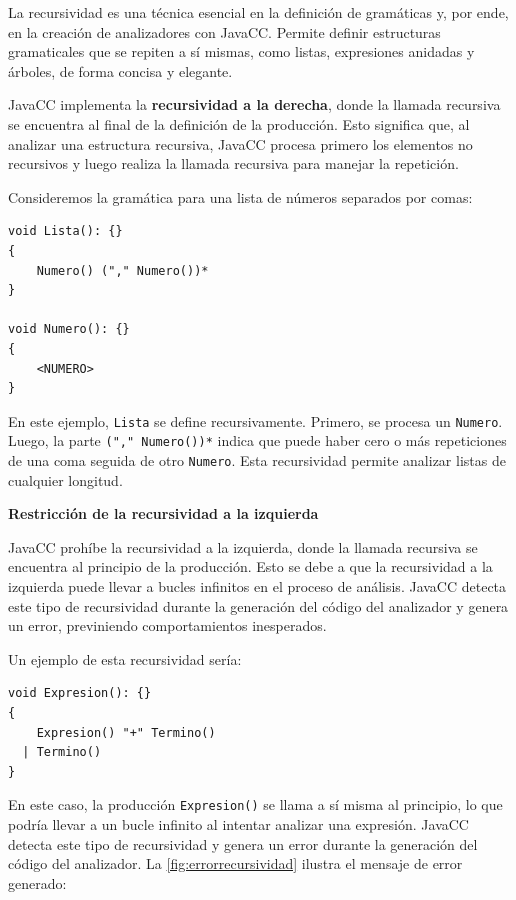 \noindent La recursividad es una técnica esencial en la definición de gramáticas y, por ende, en la creación de analizadores con JavaCC. Permite definir estructuras gramaticales que se repiten a sí mismas, como listas, expresiones anidadas y árboles, de forma concisa y elegante.

JavaCC implementa la \textbf{recursividad a la derecha}, donde la llamada recursiva se encuentra al final de la definición de la producción. Esto significa que, al analizar una estructura recursiva, JavaCC procesa primero los elementos no recursivos y luego realiza la llamada recursiva para manejar la repetición.

Consideremos la gramática para una lista de números separados por comas:


\lstset{inputencoding=utf8/latin1}
\begin{lstlisting}
void Lista(): {}
{
	Numero() ("," Numero())*
}

void Numero(): {}
{
	<NUMERO>
}
\end{lstlisting}

En este ejemplo, \lstinline|Lista| se define recursivamente. Primero, se procesa un \lstinline|Numero|. Luego, la parte \lstinline|("," Numero())*| indica que puede haber cero o más repeticiones de una coma seguida de otro \lstinline|Numero|. Esta recursividad permite analizar listas de cualquier longitud.

\phantom{text}

\noindent \textbf{Restricción de la recursividad a la izquierda}

\phantom{text}

JavaCC prohíbe la recursividad a la izquierda, donde la llamada recursiva se encuentra al principio de la producción. Esto se debe a que la recursividad a la izquierda puede llevar a bucles infinitos en el proceso de análisis. JavaCC detecta este tipo de recursividad durante la generación del código del analizador y genera un error, previniendo comportamientos inesperados.


Un ejemplo de esta recursividad sería:

\begin{lstlisting}
void Expresion(): {}
{
    Expresion() "+" Termino()
  | Termino()
}
\end{lstlisting}

En este caso, la producción \lstinline{Expresion()} se llama a sí misma al principio, lo que podría llevar a un bucle infinito al intentar analizar una expresión. JavaCC detecta este tipo de recursividad y genera un error durante la generación del código del analizador. La \autoref{fig:errorrecursividad} ilustra el mensaje de error generado:

